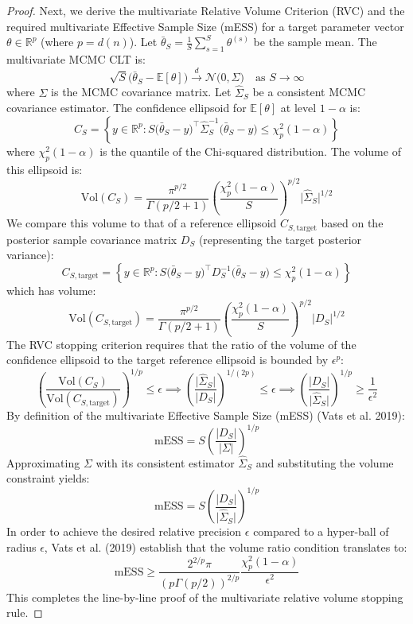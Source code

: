 \documentclass[12pt]{article}
\begin{document}
\begin{proof}
Next, we derive the multivariate Relative Volume Criterion (RVC) and the required multivariate Effective Sample Size (mESS) for a target parameter vector $\theta \in \mathbb{R}^p$ (where $p = d(n)$). Let $\bar{\theta}_S = \frac{1}{S} \sum_{s=1}^S \theta^{(s)}$ be the sample mean. The multivariate MCMC CLT is:
\[
\sqrt{S}\big(\bar{\theta}_S - \mathbb{E}[\theta]\big) \xrightarrow{d} \mathcal{N}\big(0, \Sigma\big) \quad \text{as } S \to \infty
\]
where $\Sigma$ is the MCMC covariance matrix. Let $\widehat{\Sigma}_S$ be a consistent MCMC covariance estimator. The confidence ellipsoid for $\mathbb{E}[\theta]$ at level $1 - \alpha$ is:
\[
C_S = \left\{ y \in \mathbb{R}^p : S \big(\bar{\theta}_S - y\big)^\top \widehat{\Sigma}_S^{-1} \big(\bar{\theta}_S - y\big) \leq \chi^2_p(1-\alpha) \right\}
\]
where $\chi^2_p(1-\alpha)$ is the quantile of the Chi-squared distribution. The volume of this ellipsoid is:
\[
\text{Vol}(C_S) = \frac{\pi^{p/2}}{\Gamma(p/2 + 1)} \left( \frac{\chi^2_p(1-\alpha)}{S} \right)^{p/2} \big|\widehat{\Sigma}_S\big|^{1/2}
\]
We compare this volume to that of a reference ellipsoid $C_{S, \text{target}}$ based on the posterior sample covariance matrix $D_S$ (representing the target posterior variance):
\[
C_{S, \text{target}} = \left\{ y \in \mathbb{R}^p : S \big(\bar{\theta}_S - y\big)^\top D_S^{-1} \big(\bar{\theta}_S - y\big) \leq \chi^2_p(1-\alpha) \right\}
\]
which has volume:
\[
\text{Vol}(C_{S, \text{target}}) = \frac{\pi^{p/2}}{\Gamma(p/2 + 1)} \left( \frac{\chi^2_p(1-\alpha)}{S} \right)^{p/2} \big|D_S\big|^{1/2}
\]
The RVC stopping criterion requires that the ratio of the volume of the confidence ellipsoid to the target reference ellipsoid is bounded by $\epsilon^p$:
\[
\left( \frac{\text{Vol}(C_S)}{\text{Vol}(C_{S, \text{target}})} \right)^{1/p} \leq \epsilon \implies \left( \frac{\big|\widehat{\Sigma}_S\big|}{\big|D_S\big|} \right)^{1/(2p)} \leq \epsilon \implies \left( \frac{\big|D_S\big|}{\big|\widehat{\Sigma}_S\big|} \right)^{1/p} \geq \frac{1}{\epsilon^2}
\]
By definition of the multivariate Effective Sample Size (mESS) (Vats et al. 2019):
\[
\text{mESS} = S \left( \frac{\big|D_S\big|}{\big|\Sigma\big|} \right)^{1/p}
\]
Approximating $\Sigma$ with its consistent estimator $\widehat{\Sigma}_S$ and substituting the volume constraint yields:
\[
\text{mESS} = S \left( \frac{\big|D_S\big|}{\big|\widehat{\Sigma}_S\big|} \right)^{1/p}
\]
In order to achieve the desired relative precision $\epsilon$ compared to a hyper-ball of radius $\epsilon$, Vats et al. (2019) establish that the volume ratio condition translates to:
\[
\text{mESS} \geq \frac{2^{2/p} \pi}{(p \Gamma(p/2))^{2/p}} \frac{\chi^2_p(1-\alpha)}{\epsilon^2}
\]
This completes the line-by-line proof of the multivariate relative volume stopping rule.
\end{proof}
\end{document}
